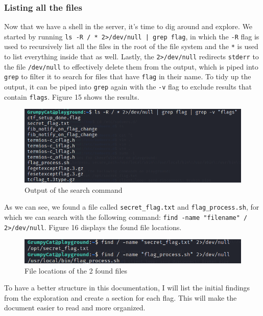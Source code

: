 \documentclass[a4paper]{article}
\newcommand{\abc}{\hfill \break}
\begin{document}
\subsubsection{Listing all the files}
Now that we have a shell in the server, it's time to dig around and explore. We started by running \abc \texttt{ls -R / * 2>/dev/null | grep flag}, in which the \texttt{-R} flag is used to recursively list all the files in the root of the file system and the \texttt{*} is used to list everything inside that as well. Lastly, the \texttt{2>/dev/null} redirects \texttt{stderr} to the file \texttt{/dev/null} to effectively delete them from the output, which is piped into \texttt{grep} to filter it to search for files that have \texttt{flag} in their name. To tidy up the output, it can be piped into \texttt{grep} again with the \texttt{-v} flag to exclude results that contain \texttt{flags}. Figure 15 shows the results. \cite{stderr}
\begin{figure}[h]
	\includegraphics[scale=0.5]{images/searchingfor falgfiles.png}
	\centering
	\caption{Output of the search command}
\end{figure}\abc
As we can see, we found a file called \texttt{secret\_flag.txt} and \texttt{flag\_process.sh}, for which we can search with the following command: \texttt{find -name "filename" / 2>/dev/null}. Figure 16 displays the found file locations.
\begin{figure}[h]
	\includegraphics[scale=0.55]{images/findfiles.png}
	\centering
	\caption{File locations of the 2 found files}
\end{figure}\abc
To have a better structure in this documentation, I will list the initial findings from the exploration and create a section for each flag. This will make the document easier to read and more organized.
\end{document}
